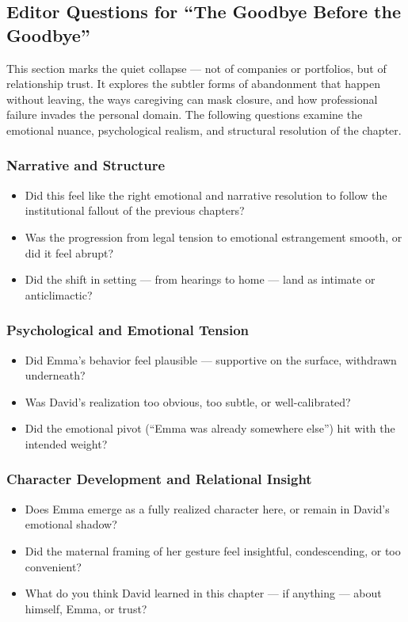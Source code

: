 \subsection*{Editor Questions for ``The Goodbye Before the Goodbye''}

This section marks the quiet collapse — not of companies or portfolios, but of relationship trust. It explores the subtler forms of abandonment that happen without leaving, the ways caregiving can mask closure, and how professional failure invades the personal domain. The following questions examine the emotional nuance, psychological realism, and structural resolution of the chapter.

\subsubsection{Narrative and Structure}

\begin{itemize}
  \item Did this feel like the right emotional and narrative resolution to follow the institutional fallout of the previous chapters?
  \item Was the progression from legal tension to emotional estrangement smooth, or did it feel abrupt?
  \item Did the shift in setting — from hearings to home — land as intimate or anticlimactic?
\end{itemize}

\subsubsection{Psychological and Emotional Tension}

\begin{itemize}
  \item Did Emma’s behavior feel plausible — supportive on the surface, withdrawn underneath?
  \item Was David’s realization too obvious, too subtle, or well-calibrated?
  \item Did the emotional pivot (“Emma was already somewhere else”) hit with the intended weight?
\end{itemize}

\subsubsection{Character Development and Relational Insight}

\begin{itemize}
  \item Does Emma emerge as a fully realized character here, or remain in David’s emotional shadow?
  \item Did the maternal framing of her gesture feel insightful, condescending, or too convenient?
  \item What do you think David learned in this chapter — if anything — about himself, Emma, or trust?
\end{itemize}

